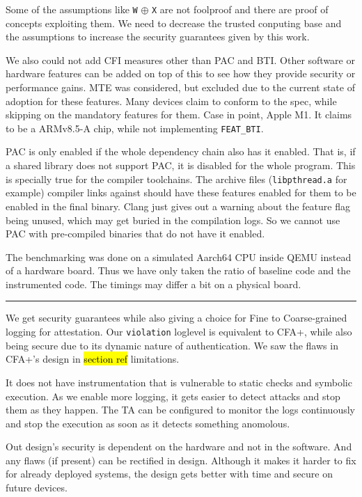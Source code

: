 \documentclass[a4paper, nobind]{templates/ociamthesis}
\begin{document}
Some of the assumptions like \texttt{W} \(\oplus\) \texttt{X} are not foolproof and there are
proof of concepts exploiting them. We need to decrease the trusted conputing base and the
assumptions to increase the security guarantees given by this work.

We also could not add CFI measures other than PAC and BTI. Other software or
hardware features can be added on top of this to see how they provide security or performance gains.
MTE was considered, but excluded due to the current state of adoption for these
features. Many devices claim to conform to the spec, while skipping on the mandatory features for them.
Case in point, Apple M1. It claims to be a ARMv8.5-A chip, while not implementing \texttt{FEAT\_BTI}.

PAC is only enabled if the whole dependency chain also has it enabled. That is, if
a shared library does not support PAC, it is disabled for the whole program.
This is specially true for the compiler toolchains. The archive
files (\texttt{libpthread.a} for example) compiler links against should have these
features enabled for them to be enabled in the final binary. Clang just gives out a
warning about the feature flag being unused, which may get buried in the compilation logs.
So we cannot use PAC with pre-compiled binaries that do not have it enabled.

The benchmarking was done on a simulated Aarch64 CPU inside QEMU instead of a
hardware board. Thus we have only taken the ratio of baseline code and the
instrumented code. The timings may differ a bit on a physical board.

\begin{center}\rule{0.5\linewidth}{0.5pt}\end{center}

We get security guarantees while also giving a choice for Fine to Coarse-grained
logging for attestation. Our \texttt{violation} loglevel is equivalent to CFA+, while also being secure due to
its dynamic nature of authentication. We saw the flaws in CFA+'s design in \hl{section ref} limitations.

It does not have instrumentation that is vulnerable to static checks and symbolic execution.
As we enable more logging, it gets easier to detect attacks and stop them as they happen.
The TA can be configured to monitor the logs continuously and stop the execution
as soon as it detects something anomolous.

Out design's security is dependent on the hardware and not in the software.
And any flaws (if present) can be rectified in design.
Although it makes it harder to fix for already deployed
systems, the design gets better with time and secure on future devices.
\end{document}
